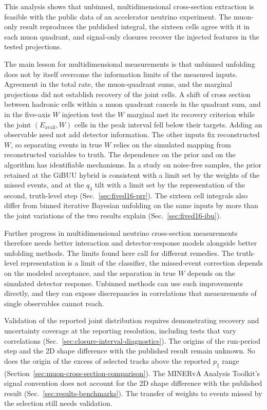 This analysis shows that unbinned, multidimensional cross-section extraction is feasible with the public data of an accelerator neutrino experiment. The muon-only result reproduces the published integral, the sixteen cells agree with it in each muon quadrant, and signal-only closures recover the injected features in the tested projections.

The main lesson for multidimensional measurements is that unbinned unfolding does not by itself overcome the information limits of the measured inputs. Agreement in the total rate, the muon-quadrant sums, and the marginal projections did not establish recovery of the joint cells. A shift of cross section between hadronic cells within a muon quadrant cancels in the quadrant sum, and in the five-axis $W$ injection test the $W$ marginal met its recovery criterion while the joint $(E_{\mathrm{avail}},W)$ cells in the peak interval fell below their targets. Adding an observable need not add detector information. The other inputs fix reconstructed $W$, so separating events in true $W$ relies on the simulated mapping from reconstructed variables to truth. The dependence on the prior and on the algorithm has identifiable mechanisms. In a study on noise-free samples, the prior retained at the GiBUU hybrid is consistent with a limit set by the weights of the missed events, and at the $q_3$ tilt with a limit set by the representation of the second, truth-level step (Sec.~\ref{sec:fived16-prr}). The sixteen cell integrals also differ from binned iterative Bayesian unfolding on the same inputs by more than the joint variations of the two results explain (Sec.~\ref{sec:fived16-ibu}).

Further progress in multidimensional neutrino cross-section measurements therefore needs better interaction and detector-response models alongside better unfolding methods. The limits found here call for different remedies. The truth-level representation is a limit of the classifier, the missed-event correction depends on the modeled acceptance, and the separation in true $W$ depends on the simulated detector response. Unbinned methods can use such improvements directly, and they can expose discrepancies in correlations that measurements of single observables cannot reach.

Validation of the reported joint distribution requires demonstrating recovery and uncertainty coverage at the reporting resolution, including tests that vary correlations (Sec.~\ref{sec:closure-interval-diagnostics}). The origins of the run-period step and the 2D shape difference with the published result remain unknown. So does the origin of the excess of selected tracks above the reported $p_\parallel$ range (Section~\ref{sec:muon-cross-section-comparison}). The MINERvA Analysis Toolkit's signal convention does not account for the 2D shape difference with the published result (Sec.~\ref{sec:results-benchmarks}). The transfer of weights to events missed by the selection still needs validation.

